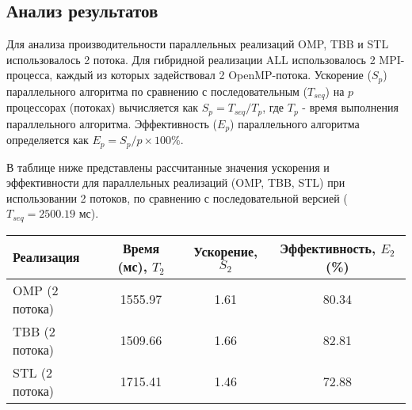 \documentclass[12pt]{article}
\begin{document}
\subsection{Анализ результатов}
Для анализа производительности параллельных реализаций OMP, TBB и STL использовалось 2 потока. Для гибридной реализации ALL использовалось 2 MPI-процесса, каждый из которых задействовал 2 OpenMP-потока.
Ускорение ($S_p$) параллельного алгоритма по сравнению с последовательным ($T_{seq}$) на $p$ процессорах (потоках) вычисляется как $S_p = T_{seq} / T_p$, где $T_p$ - время выполнения параллельного алгоритма.
Эффективность ($E_p$) параллельного алгоритма определяется как $E_p = S_p / p \times 100\%$.

В таблице ниже представлены рассчитанные значения ускорения и эффективности для параллельных реализаций (OMP, TBB, STL) при использовании 2 потоков, по сравнению с последовательной версией ($T_{seq} = 2500.19$ мс).

\begin{center}
\begin{tabular}{|l|c|c|c|}
\hline
\textbf{Реализация} & \textbf{Время (мс), $T_2$} & \textbf{Ускорение, $S_2$} & \textbf{Эффективность, $E_2$ (\%)} \\
\hline
OMP (2 потока)    & 1555.97 & 1.61                 & 80.34 \\
\hline
TBB (2 потока)    & 1509.66 & 1.66                 & 82.81 \\
\hline
STL (2 потока)    & 1715.41 & 1.46                 & 72.88 \\
\hline
\end{tabular}
\end{center}
\end{document}
